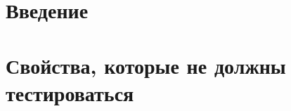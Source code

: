 \documentclass[a4paper,12pt]{article}
\begin{document}
\section{Введение}

\section{Свойства, которые не должны тестироваться}
\end{document}
